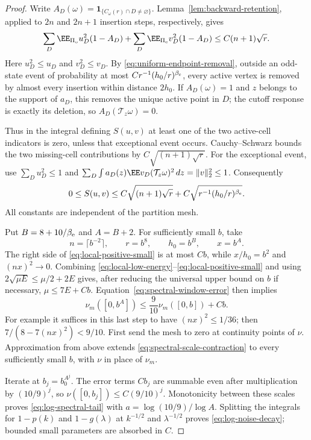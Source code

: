 \documentclass[11pt,letterpaper]{article}
\newcommand{\ind}{\mathbf 1}\newcommand{\Exp}{\operatorname{Exp}}
\begin{document}
\begin{proof}
Write $A_D(\omega)=\ind_{\{C_\omega(r)\cap D\ne\varnothing\}}$.
Lemma~\ref{lem:backward-retention}, applied to $2n$ and $2n+1$
insertion steps, respectively, gives
\[
 \sum_D\EE_{\Pi_{\rm o}}u_D^2(1-A_D)
  +\sum_D\EE_{\Pi_{\rm e}}v_D^2(1-A_D)
       \le C(n+1)\sqrt r.
\]
Here $u_D^2\le u_D$ and $v_D^2\le v_D$.
By \eqref{eq:uniform-endpoint-removal}, outside an odd-state event
of probability at most $Cr^{-1}(h_0/r)^{\beta_{\rm e}}$, every
active vertex is removed by almost every insertion within distance
$2h_0$. If $A_D(\omega)=1$ and $z$ belongs to the support of $a_D$,
this removes the unique active point in $D$; the cutoff response is
exactly its deletion, so $A_D(\mathcal T_z\omega)=0$.

Thus in the integral defining $S(u,v)$ at least one of the two
active-cell indicators is zero, unless that exceptional event occurs.
Cauchy--Schwarz bounds the two missing-cell contributions by
$C\sqrt{(n+1)\sqrt r}$. For the exceptional event, use
$\sum_Du_D^2\le1$ and
$\sum_D\int a_D(z)\EE v_D(\mathcal T_z\omega)^2\,dz=\|v\|_2^2\le1$.
Consequently
\begin{equation}\label{eq:local-positive-small}
 0\le S(u,v)\le
 C\sqrt{(n+1)\sqrt r}
   +C\sqrt{r^{-1}(h_0/r)^{\beta_{\rm e}}}.
\end{equation}
All constants are independent of the partition mesh.

Put $B=8+10/\beta_{\rm e}$ and $A=B+2$. For sufficiently small
$b$, take
\[
 n=\lceil b^{-2}\rceil,\qquad r=b^8,
 \qquad h_0=b^B,\qquad x=b^A.
\]
The right side of \eqref{eq:local-positive-small} is at most $Cb$,
while $x/h_0=b^2$ and $(nx)^2\to0$.
Combining \eqref{eq:local-low-energy}--\eqref{eq:local-positive-small}
and using $2\sqrt{\mu E}\le\mu/2+2E$ gives, after reducing the
universal upper bound on $b$ if necessary,
$\mu\le7E+Cb$. Equation~\eqref{eq:spectral-window-error} then implies
\begin{equation}\label{eq:spectral-scale-contraction}
 \nu_m([0,b^A])\le\frac9{10}\nu_m([0,b])+Cb.
\end{equation}
For example it suffices in this last step to have
$(nx)^2\le1/36$; then $7/(8-7(nx)^2)<9/10$.
First send the mesh to zero at continuity points of $\nu$.
Approximation from above extends \eqref{eq:spectral-scale-contraction}
to every sufficiently small $b$, with $\nu$ in place of $\nu_m$.

Iterate at $b_j=b_0^{A^j}$. The error terms $Cb_j$ are summable
even after multiplication by $(10/9)^j$, so
$\nu([0,b_j])\le C(9/10)^j$.
Monotonicity between these scales proves
\eqref{eq:log-spectral-tail} with $a=\log(10/9)/\log A$.
Splitting the integrals for $1-p(k)$ and $1-g(\lambda)$ at
$k^{-1/2}$ and $\lambda^{-1/2}$ proves
\eqref{eq:log-noise-decay}; bounded small parameters are absorbed in $C$.


\end{proof}
\end{document}
